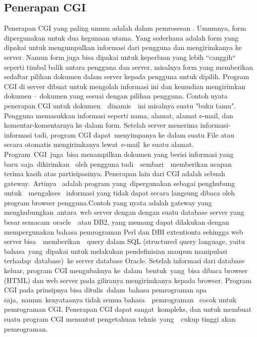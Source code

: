 \begin{enumerate}
\subsection{Penerapan CGI}
Penerapan CGI yang paling umum adalah dalam pemrosesan . Umumnya, form dipergunakan untuk dua kegunaan utama. Yang  sederhana  adalah form yang  dipakai  untuk mengumpulkan informasi dari pengguna dan mengirimkanya ke server. Namun  form juga bisa dipakai untuk keperluan  yang lebih  ``canggih``  seperti timbal balik antara pengguna dan server, misalnya  form  yang memberikan sedaftar pilihan dokumen dalam server kepada pengguna  untuk dipilih. Program CGI di server dibuat untuk mengolah informasi ini  dan kemudian mengirimkan  dokumen – dokumen yang sesuai  dengan  pilihan pengguna.
Contoh nyata penerapan CGI untuk dokumen~~dinamis~~ini  misalnya  suatu "buku tamu". Pengguna memasukkan informasi seperti nama, alamat, alamat e-mail, dan komentar-komentarnya ke dalam form. Setelah server menerima informasi-informasi tadi, program CGI dapat~menyimpanya ke dalam  suatu File atau secara otomatis mengirimkanya lewat~e-mail~ke  suatu  alamat. Program~CGI~juga~bisa menampilkan dokumen yang  berisi  informasi  yang
baru~saja~dikirimkan~ oleh  pengguna  tadi~~sembari~~memberikan  ucapan  terima kasih atas partisipasinya.
Penerapan lain dari CGI adalah sebuah gateway.~Artinya~ adalah  program yang~dipergunakan sebagai penghubung  untuk~~mengakses~ informasi  yang tidak dapat secara langsung dibaca oleh program browser pengguna.Contoh yang nyata adalah gateway yang menghubungkan~antara~web  server  dengan dengan suatu database server yang besar semacam~oracle~~atau  DB2, yang  memang dapat dilakukan dengan mempergunakan bahasa pemrograman Perl dan DBI extentionta sehingga web server bisa~~memberikan~~query  dalam  SQL (structured query language, yaitu bahasa~yang~dipakai  untuk  melakukan pendefinisian maupun manipulasi terhadap~database)~ke  server  database Oracle. Setelah informasi dari database keluar, program CGI mengubahnya ke~dalam~bentuk~yang~bisa dibaca browser (HTML)  dan  web  server  pada giliranya mengirimkanya kepada browser.
Program CGI pada prinsipnya bisa ditulis~dalam~bahasa  pemrograman  apa saja,~namun~kenyataanya tidak  semua  bahasa~~pemrograman~ cocok  untuk pemrograman CGI. Penerapan CGI dapat sangat~kompleks, dan untuk membuat  suatu program CGI menuntut pengetahuan teknis~yang~~cukup  tinggi  akan pemrograman. \par

\end{enumerate}
